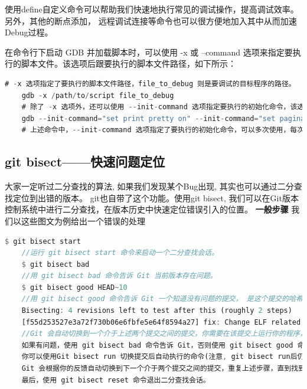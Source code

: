 使用define自定义命令可以帮助我们快速地执行常见的调试操作，提高调试效率。 另外，其他的断点添加， 远程调试连接等命令也可以很方便地加入其中从而加速Debug过程。

在命令行下启动 GDB 并加载脚本时，可以使用 -x 或 –command 选项来指定要执行的脚本文件。该选项后跟要执行的脚本文件路径，如下所示：

\begin{lstlisting}[language={Rust}, label={code:forktest},
	caption={forktest1.rs}]
	# -x 选项指定了要执行的脚本文件路径，file_to_debug 则是要调试的目标程序的路径。
	gdb -x /path/to/script file_to_debug
	# 除了 -x 选项外，还可以使用 --init-command 选项指定要执行的初始化命令，该选项可以多次使用，每次指定一条命令，如下所示：
	gdb --init-command="set print pretty on" --init-command="set pagination off" file_to_debug
	# 上述命令中，--init-command 选项指定了要执行的初始化命令，可以多次使用，每次指定一条命令。
\end{lstlisting}


\subsection{git bisect——快速问题定位}
大家一定听过二分查找的算法, 如果我们发现某个Bug出现, 其实也可以通过二分查找定位到出错的版本。
git也自带了这个功能。使用git bisect, 我们可以在Git版本控制系统中进行二分查找，在版本历史中快速定位错误引入的位置。
\textbf{一般步骤}
我们以这些图文为例给出一个错误的处理
\begin{lstlisting}[language={Rust}, label={code:forktest},]
	$ git bisect start
	//运行 git bisect start 命令来启动一个二分查找会话。
	$ git bisect bad
	//用 git bisect bad 命令告诉 Git 当前版本存在问题。
	$ git bisect good HEAD~10
	//用 git bisect good 命令告诉 Git 一个知道没有问题的提交， 是这个提交的哈希值或分支名。git会给出估计的剩余步骤数
	Bisecting: 4 revisions left to test after this (roughly 2 steps)
	[f55d253527e3a72f730b06e6fbfe5e64f8594a27] fix: Change ELF related AuxV data alignment to repr(C), fixing the LPF.
	//Git 会自动切换到一个介于上述两个提交之间的提交，你需要在该提交上运行你的程序，检查问题是否存在。
	如果有问题，使用 git bisect bad 命令告诉 Git，否则使用 git bisect good 命令告诉 Git。
	你可以使用Git bisect run 切换提交后自动执行的命令(注意, git bisect run后仍然在原地, 这时候需要git bisect next才能进入下一个, 否则会冲突)
	Git 会根据你的反馈自动切换到下一个介于两个提交之间的提交，重复上述步骤，直到找到引入问题的提交。
	最后，使用 git bisect reset 命令退出二分查找会话。
\end{lstlisting}

